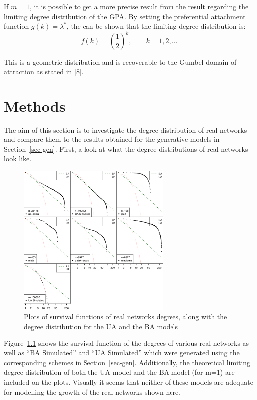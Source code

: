 \documentclass[
  10pt,
  a4paper,
]{scrreprt}
\theoremstyle{plain}
\theoremstyle{definition}
\theoremstyle{plain}
\theoremstyle{remark}
\begin{document}
{If \(m=1\), it is possible to get a more precise result from the result
regarding the limiting degree distribution of the GPA. By setting the
preferential attachment function \(g(k) = \lambda^*\), the can be shown
that the limiting degree distribution is: \[
f(k) = \left(\frac{1}{2} \right)^{k}, \qquad k=1,2,\ldots 
\]

This is a geometric distribution and is recoverable to the Gumbel domain
of attraction as stated in {[}\protect\hyperlink{ref-shimura12}{8}{]}.

\hypertarget{sec-meth}{%
\chapter{Methods}\label{sec-meth}}

The aim of this section is to investigate the degree distribution of
real networks and compare them to the results obtained for the
generative models in Section~\ref{sec-gen}. First, a look at what the
degree distributions of real networks look like.

\begin{figure}[H]

{\centering \includegraphics[width=0.66\textwidth,height=\textheight]{doc_files/figure-pdf/fig-survs-1.pdf}

}

\caption{\label{fig-survs}Plots of survival functions of real networks
degrees, along with the degree distribution for the UA and the BA
models}

\end{figure}

Figure~\ref{fig-survs} shows the survival function of the degrees of
various real networks as well as ``BA Simulated'' and ``UA Simulated''
which were generated using the corresponding schemes in
Section~\ref{sec-gen}. Additionally, the theoretical limiting degree
distribution of both the UA model and the BA model (for m=1) are
included on the plots. Visually it seems that neither of these models
are adequate for modelling the growth of the real networks shown here.

}
\end{document}
